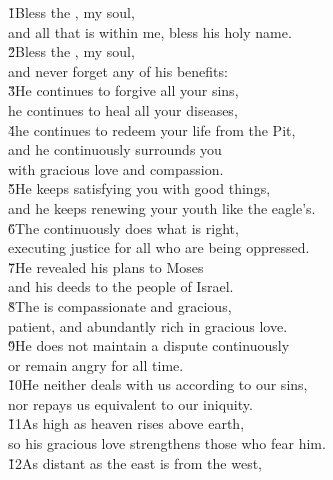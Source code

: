 \begin{poetry}
\poeml \v{1}Bless the , my soul, \\
\poemll    and all that is within me, bless his holy name. \\
\poeml \v{2}Bless the , my soul, \\
\poemll    and never forget any of his benefits: \\
\poeml \v{3}He continues to forgive all your sins, \\
\poemll    he continues to heal all your diseases, \\
\poeml \v{4}he continues to redeem your life from the Pit, \\
\poemll    and he continuously surrounds you \\
\poemlll       with gracious love and compassion. \\
\poeml \v{5}He keeps satisfying you with good things, \\
\poemll    and he keeps renewing your youth like the eagle's. \\
\poeml \v{6}The  continuously does what is right, \\
\poemll    executing justice for all who are being oppressed. \\
\poeml \v{7}He revealed his plans to Moses \\
\poemll    and his deeds to the people of Israel. \\
\poeml \v{8}The  is compassionate and gracious, \\
\poemll    patient, and abundantly rich in gracious love. \\
\poeml \v{9}He does not maintain a dispute continuously \\
\poemll    or remain angry for all time. \\
\poeml \v{10}He neither deals with us according to our sins, \\
\poemll    nor repays us equivalent to our iniquity. \\
\poeml \v{11}As high as heaven rises above earth, \\
\poemll    so his gracious love strengthens those who fear him. \\
\poeml \v{12}As distant as the east is from the west, \\

\end{poetry}
